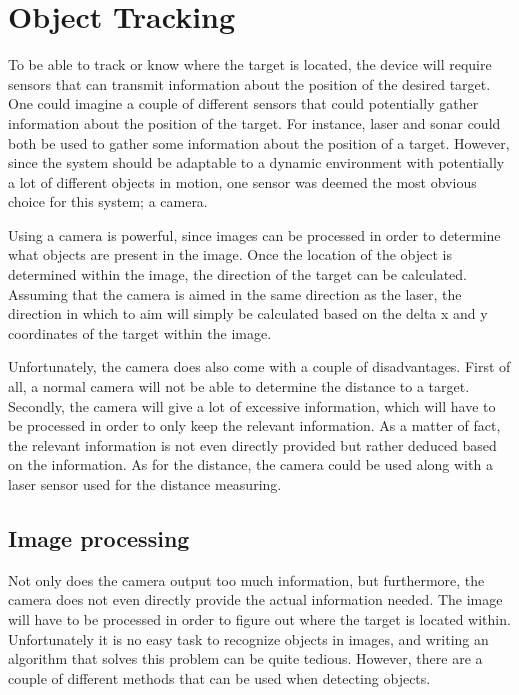\section{Object Tracking}
\label{sec:obj_tracking}

To be able to track or know where the target is located, the device will require sensors that can transmit information about the position of the desired target.
One could imagine a couple of different sensors that could potentially gather information about the position of the target.
For instance, laser and sonar could both be used to gather some information about the position of a target\cite{Sensors}.
However, since the system should be adaptable to a dynamic environment with potentially a lot of different objects in motion, one sensor was deemed the most obvious choice for this system; a camera.

Using a camera is powerful, since images can be processed in order to determine what objects are present in the image.
Once the location of the object is determined within the image, the direction of the target can be calculated.
Assuming that the camera is aimed in the same direction as the laser, the direction in which to aim will simply be calculated based on the delta x and y coordinates of the target within the image.

Unfortunately, the camera does also come with a couple of disadvantages.
First of all, a normal camera will not be able to determine the distance to a target.
Secondly, the camera will give a lot of excessive information, which will have to be processed in order to only keep the relevant information. 
As a matter of fact, the relevant information is not even directly provided but rather deduced based on the information.
As for the distance, the camera could be used along with a laser sensor used for the distance measuring\cite{Sensors}.

\subsection{Image processing}
Not only does the camera output too much information, but furthermore, the camera does not even directly provide the actual information needed.
The image will have to be processed in order to figure out where the target is located within.
Unfortunately it is no easy task to recognize objects in images, and writing an algorithm that solves this problem can be quite tedious.
However, there are a couple of different methods that can be used when detecting objects.

